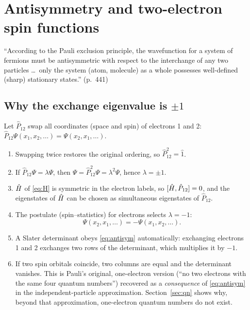 \section{Antisymmetry and two-electron spin functions}\label{sec:anti}

\begin{reviewclaim}
``According to the Pauli exclusion principle, the wavefunction for a system of fermions must be
antisymmetric with respect to the interchange of any two particles \dots\ only the system (atom,
molecule) as a whole possesses well-defined (sharp) stationary states.'' (p.~441)
\end{reviewclaim}

\subsection{Why the exchange eigenvalue is $\pm1$}
Let $\hat P_{12}$ swap all coordinates (space and spin) of electrons 1 and 2:
$\hat P_{12}\Psi(x_1,x_2,\dots)=\Psi(x_2,x_1,\dots)$.
\begin{enumerate}
  \item Swapping twice restores the original ordering, so $\hat P_{12}^2=\hat 1$.
  \item If $\hat P_{12}\Psi=\lambda\Psi$, then $\Psi=\hat P_{12}^2\Psi=\lambda^2\Psi$, hence $\lambda=\pm1$.
  \item $\hat H$ of \cref{eq:H} is symmetric in the electron labels, so $[\hat H,\hat P_{12}]=0$, and the
        eigenstates of $\hat H$ can be chosen as simultaneous eigenstates of $\hat P_{12}$.
  \item The postulate (spin--statistics) for electrons selects $\lambda=-1$:
        \begin{equation}\label{eq:antisym}
          \Psi(x_2,x_1,\dots)=-\Psi(x_1,x_2,\dots).
        \end{equation}
  \item A Slater determinant obeys \cref{eq:antisym} automatically: exchanging electrons 1 and 2
        exchanges two rows of the determinant, which multiplies it by $-1$.
  \item If two spin orbitals coincide, two columns are equal and the determinant vanishes. This is
        Pauli's original, one-electron version (``no two electrons with the same four quantum
        numbers'') recovered as a \emph{consequence} of \cref{eq:antisym} in the independent-particle
        approximation. Section~\ref{sec:qn} shows why, beyond that approximation, one-electron quantum
        numbers do not exist.
\end{enumerate}

